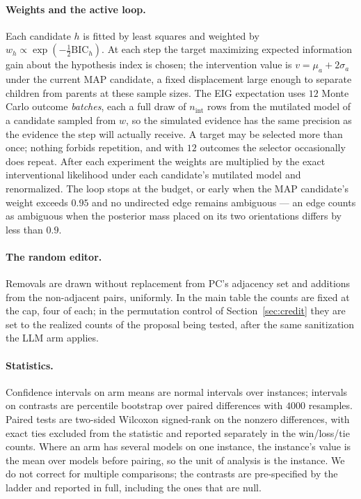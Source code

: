 \documentclass{article}
\begin{document}
\paragraph{Weights and the active loop.}
Each candidate $h$ is fitted by least squares and weighted by $w_h \propto \exp(-\tfrac{1}{2}
\mathrm{BIC}_h)$. At each step the target maximizing expected information gain about the hypothesis
index is chosen; the intervention value is $v = \mu_a + 2\sigma_a$ under the current MAP candidate,
a fixed displacement large enough to separate children from parents at these sample sizes. The EIG
expectation uses $12$ Monte Carlo outcome \emph{batches}, each a full draw of $n_{\mathrm{int}}$
rows from the mutilated model of a candidate sampled from $w$, so the simulated evidence has the
same precision as the evidence the step will actually receive. A target may be selected more than
once; nothing forbids repetition, and with $12$ outcomes the selector occasionally does repeat.
After each experiment the weights are multiplied by the exact interventional likelihood under each
candidate's mutilated model and renormalized. The loop stops at the budget, or early when the MAP
candidate's weight exceeds $0.95$ and no undirected edge remains ambiguous --- an edge counts as
ambiguous when the posterior mass placed on its two orientations differs by less than $0.9$.

\paragraph{The random editor.}
Removals are drawn without replacement from PC's adjacency set and additions from the non-adjacent
pairs, uniformly. In the main table the counts are fixed at the cap, four of each; in the
permutation control of Section~\ref{sec:credit} they are set to the realized counts of the proposal
being tested, after the same sanitization the LLM arm applies.

\paragraph{Statistics.}
Confidence intervals on arm means are normal intervals over instances; intervals on contrasts are
percentile bootstrap over paired differences with $4000$ resamples. Paired tests are two-sided
Wilcoxon signed-rank on the nonzero differences, with exact ties excluded from the statistic and
reported separately in the win/loss/tie counts. Where an arm has several models on one instance,
the instance's value is the mean over models before pairing, so the unit of analysis is the
instance. We do not correct for multiple comparisons; the contrasts are pre-specified by the ladder
and reported in full, including the ones that are null.
\end{document}
